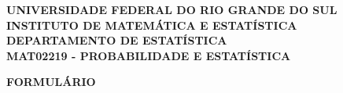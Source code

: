 \documentclass[10pt]{article}%
\begin{document}
\begin{center}
{\bf 
UNIVERSIDADE FEDERAL DO RIO GRANDE DO SUL\\
INSTITUTO DE MATEMÁTICA E ESTATÍSTICA\\
DEPARTAMENTO DE ESTATÍSTICA\\
MAT02219 - PROBABILIDADE E ESTATÍSTICA}\\
\vspace*{0.1cm}{\bf ÁREA 2}
\end{center}
%
\begin{center}
{\bf FORMULÁRIO}
\end{center}
\end{document}
